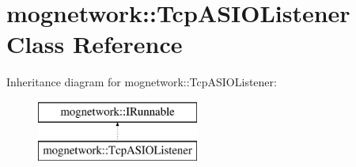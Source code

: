 \hypertarget{classmognetwork_1_1_tcp_a_s_i_o_listener}{\section{mognetwork\-:\-:Tcp\-A\-S\-I\-O\-Listener Class Reference}
\label{classmognetwork_1_1_tcp_a_s_i_o_listener}
}
Inheritance diagram for mognetwork\-:\-:Tcp\-A\-S\-I\-O\-Listener\-:\begin{figure}[H]
\begin{center}
\leavevmode
\includegraphics[height=2.000000cm]{classmognetwork_1_1_tcp_a_s_i_o_listener}
\end{center}
\end{figure}
